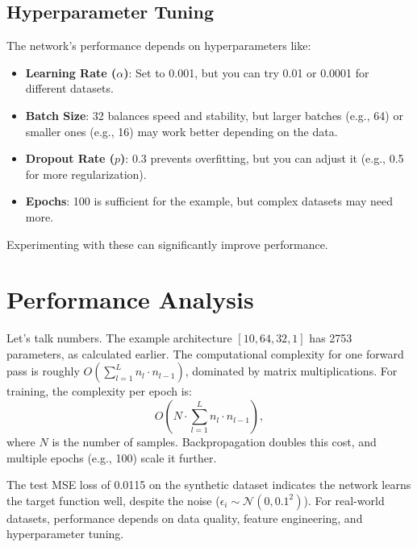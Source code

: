 \documentclass[11pt, a4paper]{article}
\begin{document}
\subsection{Hyperparameter Tuning}
The network’s performance depends on hyperparameters like:
\begin{itemize}
    \item \textbf{Learning Rate ($\alpha$)}: Set to 0.001, but you can try 0.01 or 0.0001 for different datasets.
    \item \textbf{Batch Size}: 32 balances speed and stability, but larger batches (e.g., 64) or smaller ones (e.g., 16) may work better depending on the data.
    \item \textbf{Dropout Rate ($p$)}: 0.3 prevents overfitting, but you can adjust it (e.g., 0.5 for more regularization).
    \item \textbf{Epochs}: 100 is sufficient for the example, but complex datasets may need more.
\end{itemize}
Experimenting with these can significantly improve performance.

\section{Performance Analysis}
Let’s talk numbers. The example architecture $[10, 64, 32, 1]$ has 2753 parameters, as calculated earlier. The computational complexity for one forward pass is roughly $O(\sum_{l=1}^L n_l \cdot n_{l-1})$, dominated by matrix multiplications. For training, the complexity per epoch is:
\begin{equation}
    O\left(N \cdot \sum_{l=1}^L n_l \cdot n_{l-1}\right),
\end{equation}
where $N$ is the number of samples. Backpropagation doubles this cost, and multiple epochs (e.g., 100) scale it further.

The test MSE loss of 0.0115 on the synthetic dataset indicates the network learns the target function well, despite the noise ($\epsilon_i \sim \mathcal{N}(0, 0.1^2)$). For real-world datasets, performance depends on data quality, feature engineering, and hyperparameter tuning.
\end{document}
